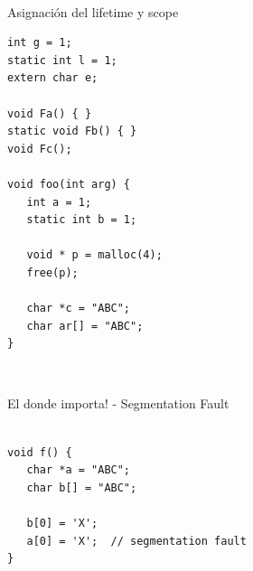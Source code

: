 ~%
\begin{frame}[fragile]{Asignaci\'on del lifetime y scope}
         \begin{lstlisting}[style=normal]
int g = 1;
static int l = 1;
extern char e;

void Fa() { }
static void Fb() { }
void Fc();

void foo(int arg) {
   int a = 1;
   static int b = 1;

   void * p = malloc(4);
   free(p);

   char *c = "ABC";
   char ar[] = "ABC";
}
         \end{lstlisting}
\end{frame}
~%

\begin{frame}[fragile]{El donde importa! - Segmentation Fault}
         \begin{lstlisting}[style=normal]

void f() {
   char *a = "ABC";
   char b[] = "ABC";

   b[0] = 'X';
   a[0] = 'X';  // segmentation fault
}
         \end{lstlisting}
\end{frame}

